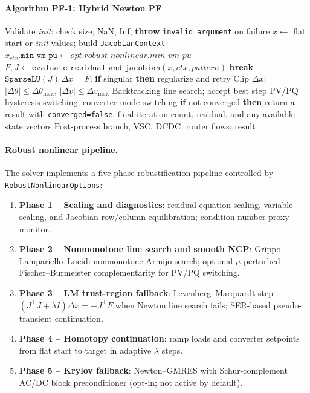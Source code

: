 \paragraph{Algorithm PF-1: Hybrid Newton PF}
\begin{algorithmic}[1]
  \State Validate \textit{init}: check size, NaN, Inf; \textbf{throw} \texttt{invalid\_argument} on failure
  \State $x \gets$ flat start or \textit{init} values; build \texttt{JacobianContext}
  \State $x_{\textit{ctx}}\texttt{.min\_vm\_pu} \gets \textit{opt.robust\_nonlinear.min\_vm\_pu}$
    \State $F, J \gets \texttt{evaluate\_residual\_and\_jacobian}(x, \textit{ctx}, \textit{pattern})$
     \textbf{break} \EndIf
    \State $\texttt{SparseLU}(J)\,\Delta x = F$;\quad
      \textbf{if} singular \textbf{then} regularize and retry
    \State Clip $\Delta x$: $|\Delta\theta|\le\Delta\theta_{\max}$, $|\Delta v|\le\Delta v_{\max}$
    \State Backtracking line search; accept best step
    \State PV/PQ hysteresis switching; converter mode switching
  \EndFor
  \State \textbf{if} not converged \textbf{then} return a result with \texttt{converged=false}, final iteration count, residual, and any available state vectors
  \State Post-process branch, VSC, DCDC, router flows; \Return result
\EndProcedure
\end{algorithmic}

\paragraph{Robust nonlinear pipeline.}
The solver implements a five-phase robustification pipeline controlled by
\texttt{RobustNonlinearOptions}:
\begin{enumerate}
  \item \textbf{Phase 1 -- Scaling and diagnostics}: residual-equation scaling,
    variable scaling, and Jacobian row/column equilibration;
    condition-number proxy monitor.
  \item \textbf{Phase 2 -- Nonmonotone line search and smooth NCP}: Grippo--Lampariello--Lucidi
    nonmonotone Armijo search; optional \(\mu\)-perturbed Fischer--Burmeister
    complementarity for PV/PQ switching.
  \item \textbf{Phase 3 -- LM trust-region fallback}: Levenberg--Marquardt step
    \((J^\top J + \lambda I)\Delta x = -J^\top F\) when Newton line search fails;
    SER-based pseudo-transient continuation.
  \item \textbf{Phase 4 -- Homotopy continuation}: ramp loads and converter
    setpoints from flat start to target in adaptive \(\lambda\) steps.
  \item \textbf{Phase 5 -- Krylov fallback}: Newton--GMRES with Schur-complement
    AC/DC block preconditioner (opt-in; not active by default).
\end{enumerate}

